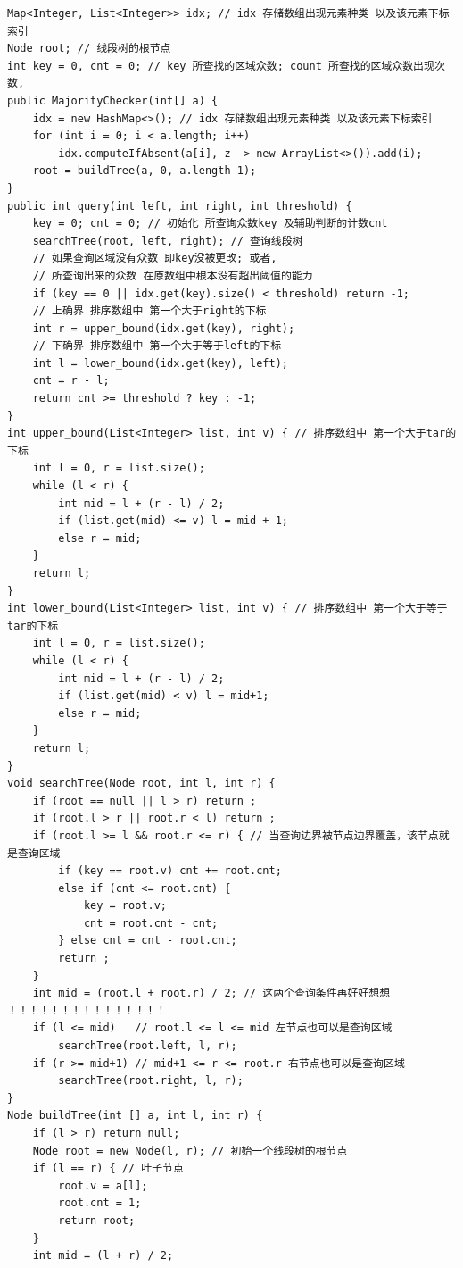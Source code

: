 \documentclass[9pt, b5paaper]{book}
\begin{document}
\begin{enumerate}
\begin{verbatim}
Map<Integer, List<Integer>> idx; // idx 存储数组出现元素种类 以及该元素下标索引
Node root; // 线段树的根节点
int key = 0, cnt = 0; // key 所查找的区域众数; count 所查找的区域众数出现次数, 
public MajorityChecker(int[] a) {
    idx = new HashMap<>(); // idx 存储数组出现元素种类 以及该元素下标索引
    for (int i = 0; i < a.length; i++)
        idx.computeIfAbsent(a[i], z -> new ArrayList<>()).add(i);
    root = buildTree(a, 0, a.length-1);
}
public int query(int left, int right, int threshold) {
    key = 0; cnt = 0; // 初始化 所查询众数key 及辅助判断的计数cnt
    searchTree(root, left, right); // 查询线段树
    // 如果查询区域没有众数 即key没被更改; 或者,
    // 所查询出来的众数 在原数组中根本没有超出阈值的能力
    if (key == 0 || idx.get(key).size() < threshold) return -1;
    // 上确界 排序数组中 第一个大于right的下标
    int r = upper_bound(idx.get(key), right);
    // 下确界 排序数组中 第一个大于等于left的下标
    int l = lower_bound(idx.get(key), left);
    cnt = r - l;
    return cnt >= threshold ? key : -1;
}
int upper_bound(List<Integer> list, int v) { // 排序数组中 第一个大于tar的下标
    int l = 0, r = list.size();
    while (l < r) {
        int mid = l + (r - l) / 2;
        if (list.get(mid) <= v) l = mid + 1;
        else r = mid;
    }
    return l;
}
int lower_bound(List<Integer> list, int v) { // 排序数组中 第一个大于等于tar的下标
    int l = 0, r = list.size();
    while (l < r) {
        int mid = l + (r - l) / 2;
        if (list.get(mid) < v) l = mid+1;
        else r = mid;
    }
    return l;
}
void searchTree(Node root, int l, int r) {
    if (root == null || l > r) return ;
    if (root.l > r || root.r < l) return ;
    if (root.l >= l && root.r <= r) { // 当查询边界被节点边界覆盖，该节点就是查询区域
        if (key == root.v) cnt += root.cnt;
        else if (cnt <= root.cnt) {
            key = root.v;
            cnt = root.cnt - cnt;
        } else cnt = cnt - root.cnt;
        return ;
    }
    int mid = (root.l + root.r) / 2; // 这两个查询条件再好好想想 ！！！！！！！！！！！！！！！
    if (l <= mid)   // root.l <= l <= mid 左节点也可以是查询区域
        searchTree(root.left, l, r);
    if (r >= mid+1) // mid+1 <= r <= root.r 右节点也可以是查询区域
        searchTree(root.right, l, r);
}
Node buildTree(int [] a, int l, int r) {
    if (l > r) return null;
    Node root = new Node(l, r); // 初始一个线段树的根节点
    if (l == r) { // 叶子节点  
        root.v = a[l];
        root.cnt = 1;
        return root;
    }
    int mid = (l + r) / 2;

\end{verbatim}
\end{enumerate}
\end{document}

